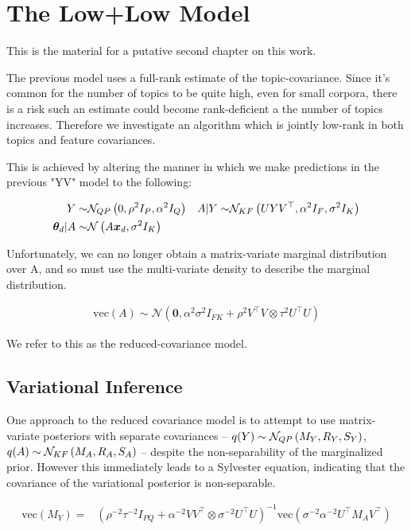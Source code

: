 \documentclass[10pt,fleqn]{article}
\newcommand \vecf[1] {
    \text{vec}\left(#1\right)
}
\newcommand \T { ^\top }
\newcommand \vv[1] { \bm #1 }
\newcommand \thd[0]  { { \vv \theta_d } }
\newcommand \axd     { A\bm x_d}
\newcommand \nor[2]   { \mathcal{N} \left( {#1}, {#2} \right) }
\newcommand \inv[1] { {#1}^{-1} }
\newcommand \invb[1] { \inv{\left( #1 \right)} }
\begin{document}
\section{The Low+Low Model}
This is the material for a putative second chapter on this work.

The previous model uses a full-rank estimate of the topic-covariance. Since it's common for the number of topics to be quite high, even for small corpora, there is a risk such an estimate could become rank-deficient a the number of topics increases. Therefore we investigate an algorithm which is jointly low-rank in both topics and feature covariances.

This is achieved by altering the manner in which we make predictions in the previous "YV" model to the following:

\begin{align}
Y \sim & \mnord{QP}{0}{\rho^2 I_P}{\alpha^2 I_Q} & A|Y \sim & \mnord{KF}{UYV\T}{\alpha^2 I_F}{\sigma^2 I_K} \\
\thd | A \sim & \nor{\axd}{\sigma^2 I_K}
\end{align}

Unfortunately, we can no longer obtain a matrix-variate marginal distribution over A, and so must use the multi-variate density to describe the marginal distribution.  

\begin{align}
\vecf{A} \sim \nor{\vv{0}}{\alpha^2 \sigma^2 I_{FK} + \rho^2 V\T V \otimes \tau^2 U\T U}
\end{align}

We refer to this as the reduced-covariance model.

\subsection{Variational Inference}
One approach to the reduced covariance model is to attempt to use matrix-variate posteriors with separate covariances -- $q(Y) \sim \mathcal{N}_{{QP}} \left(M_Y, R_Y, S_Y\right)$, $q(A) \sim \mathcal{N}_{{KF}} \left(M_A, R_A, S_A\right)$ --  despite the non-separability of the marginalized prior. However this immediately leads to a Sylvester equation, indicating that the covariance of the variational posterior is non-separable.

\begin{align}
\vecf{M_Y} = & \invb{\rho^{-2}\tau^{-2} I_{PQ} + \alpha^{-2}V V\T \otimes \sigma^{-2} U \T U}\vecf{\sigma^{-2}\alpha^{-2} U\T M_A V\T}
\end{align}
\end{document}
